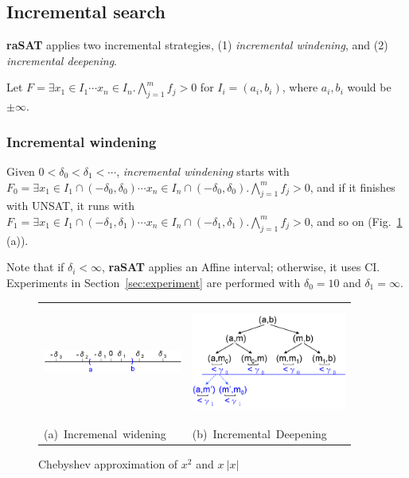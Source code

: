 \documentclass[runningheads,a4paper,oribibl]{llncs}
\begin{document}
\subsection{Incremental search} 

{\bf raSAT} applies two incremental strategies, 
(1) {\em incremental windening}, and (2) {\em incremental deepening}. 

Let
$F = \exists x_1 \in I_1 \cdots x_n \in I_n. \bigwedge \limits_{j=1}^m f_j > 0$
for $I_i = (a_i,b_i)$, where $a_i, b_i$ would be $\pm \infty$. 

\subsubsection*{Incremental windening}
Given $0 < \delta_0 < \delta_1 < \cdots$, 
{\em incremental windening} starts with 
$F_0 = \exists x_1 \in I_1 \cap (-\delta_0 , \delta_0) \cdots x_n \in I_n \cap (-\delta_0 , \delta_0). 
\bigwedge \limits_{j=1}^m f_j > 0$, 
and if it finishes with UNSAT, it runs with 
$F_1 = \exists x_1 \in I_1 \cap (-\delta_1 , \delta_1) \cdots x_n \in I_n \cap (-\delta_1 , \delta_1). 
\bigwedge \limits_{j=1}^m f_j > 0$, and so on (Fig.~\ref{fig:incwid} (a)). 

Note that if $\delta_i < \infty$, {\bf raSAT} applies an Affine interval; otherwise, 
it uses CI. 
Experiments in Section~\ref{sec:experiment} are performed 
with $\delta_0 = 10$ and $\delta_1 = \infty$.


\begin{figure}[ht]
\begin{minipage}[b]{1.0\linewidth}
\centering
\begin{tabular}{l@{\qquad}l}
\includegraphics[height=0.4in,width=1.8in]{IncWiden.png} &
\includegraphics[height=1.5in,width=2in]{IncDeepen.png} \\
\mbox{(a) Incremenal widening} & \mbox{(b) Incremental Deepening} \\
\end{tabular}
\caption{Chebyshev approximation of $x^2$ and $x~|x|$}
\label{fig:incwid}
\end{minipage}
\end{figure}
\end{document}
